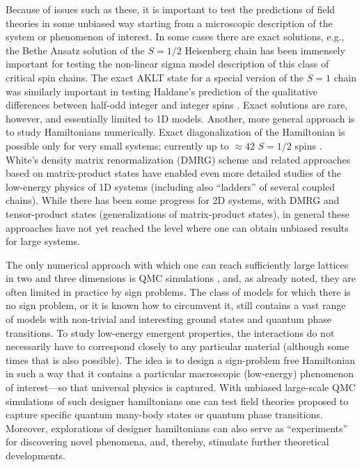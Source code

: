 \documentclass[range]{ar2e}
\begin{document}
Because of issues such as these, it is important to test the predictions of field theories in some unbiased way
starting from a microscopic description of the system or phenomenon of interest. In some cases there are exact solutions, 
e.g., the Bethe Ansatz solution of the $S=1/2$ Heisenberg chain \cite{Bethe31} has been immensely important for testing 
the non-linear sigma model description of this class of critical spin chains. The exact AKLT state \cite{affleck88} for a special 
version of the $S=1$ chain was similarly important in testing Haldane's prediction of the qualitative differences between 
half-odd integer and integer spins \cite{Haldane83}. Exact solutions are rare, however, and essentially limited to 1D models. 
Another, more general approach is to study Hamiltonians numerically. Exact diagonalization of the Hamiltonian is possible 
only for very small systems; currently up to $\approx 42$ $S=1/2$ spins \cite{Nakano11,Lauchli11}. White's density matrix 
renormalization (DMRG) scheme \cite{White92} and related approaches based on matrix-product states \cite{Schollwock05} 
have enabled even more detailed studies of the low-energy physics of 1D systems (including also ``ladders'' of several 
coupled chains). While there has been some progress for 2D systems, with DMRG \cite{Stoudenmire12} and tensor-product 
\cite{Murg09} states (generalizations of matrix-product states), in general these approaches have not yet reached the 
level where one can obtain unbiased results for large systems.

The only numerical approach with which one can reach sufficiently large lattices in two and three dimensions is QMC 
simulations \cite{Evertz03,Sandvik10b}, and, as already noted, they are often limited in practice by sign problems. The 
class of models for which there is no sign problem, or it is known how to circumvent it, still contains a vast range of 
models with non-trivial and interesting ground states and quantum phase transitions. To study low-energy emergent 
properties, the interactions do not necessarily have to correspond closely to any particular material (although some 
times that is also possible). The idea is to design a sign-problem free Hamiltonian in such a way that it contains a 
particular macroscopic (low-energy) phenomenon of interest---so that universal physics is captured. With unbiased large-scale 
QMC simulations of such designer hamiltonians one can test field theories proposed to capture specific quantum many-body 
states or quantum phase transitions. Moreover, explorations of designer hamiltonians can also serve as ``experiments'' 
for discovering novel phenomena, and, thereby, stimulate further theoretical developments.
\end{document}
